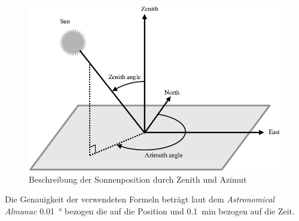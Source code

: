 \begin{figure}[H]
  \centering
  \includegraphics[width=\textwidth]{./img/Representation-of-azimuth-and-zenith-angles.png}
  \caption{Beschreibung der Sonnenposition durch Zenith und Azimut~\cite{Nou2016}}\label{fig:zen_azi}
\end{figure}

Die Genauigkeit der verwendeten Formeln beträgt laut dem \emph{Astronomical Almanac} \SI{0.01}{\degree} bezogen die auf die Position und \SI{0.1}{\minute} bezogen auf die Zeit.


